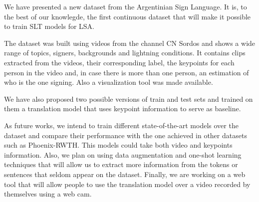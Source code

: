 We have presented a new dataset from the Argentinian Sign Language. It is, to the best of our knowlegde, the first continuous dataset that will make it possible to train SLT models for LSA.

The dataset was built using videos from the channel CN Sordos and shows a wide range of topics, signers, backgrounds and lightning conditions. It contains clips extracted from the videos, their corresponding label, the keypoints for each person in the video and, in case there is more than one person, an estimation of who is the one signing. Also a visualization tool was made available.

We have also proposed two possible versions of train and test sets and trained on them a translation model that uses keypoint information to serve as baseline.

As future works, we intend to train different state-of-the-art models over the dataset and compare their performance with the one achieved in other datasets such as Phoenix-RWTH. This models could take both video and keypoints information. Also, we plan on using data augmentation and one-shot learning techniques that will allow us to extract more information from the tokens or sentences that seldom appear on the dataset. Finally, we are working on a web tool that will allow people to use the translation model over a video recorded by themselves using a web cam.
